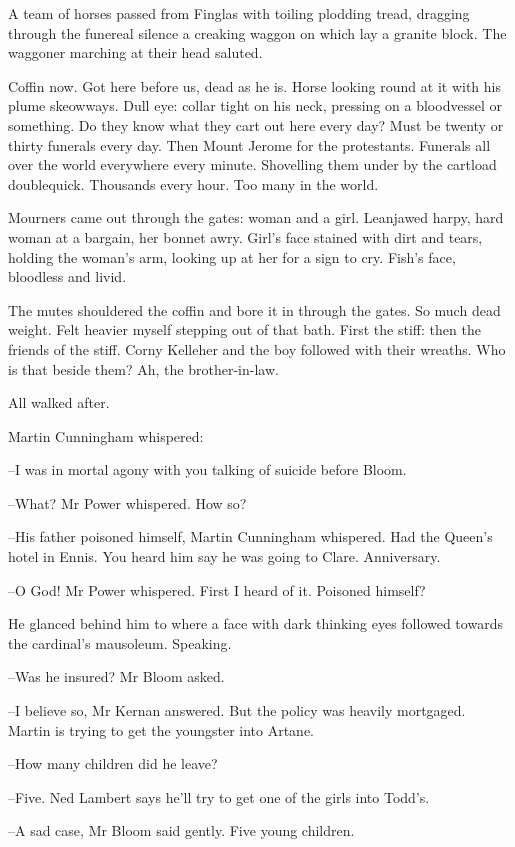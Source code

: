 A team of horses passed from Finglas with toiling plodding tread,
dragging through the funereal silence a creaking waggon
on which lay a granite block.
The waggoner marching at their head saluted.

Coffin now.
Got here before us, dead as he is.
Horse looking round at it with his plume skeowways.
Dull eye:
collar tight on his neck,
pressing on a bloodvessel or something.
Do they know what they cart out here every day?
Must be twenty or thirty funerals every day.
Then Mount Jerome for the protestants.
Funerals all over the world
everywhere every minute.
Shovelling them under by the cartload doublequick.
Thousands every hour.
Too many in the world.

Mourners came out through the gates:
woman and a girl.
Leanjawed harpy, hard woman at a bargain, her bonnet awry.
Girl's face stained with dirt and tears,
holding the woman's arm, looking up at her for a sign to cry.
Fish's face, bloodless and livid.

The mutes shouldered the coffin and bore it in through the gates.
So much dead weight.
Felt heavier myself stepping out of that bath.
First the stiff:
then the friends of the stiff.
Corny Kelleher and the boy followed with their wreaths.
Who is that beside them?
Ah, the brother-in-law.

All walked after.

Martin Cunningham whispered:

--I was in mortal agony with you talking of suicide before Bloom.

--What?
Mr Power whispered.
How so?

--His father poisoned himself,
Martin Cunningham whispered.
Had the Queen's hotel in Ennis.
You heard him say he was going to Clare.
Anniversary.

--O God!
Mr Power whispered.
First I heard of it.
Poisoned himself?

He glanced behind him to where
a face with dark thinking eyes followed towards the cardinal's mausoleum.
Speaking.

--Was he insured?
Mr Bloom asked.

--I believe so,
Mr Kernan answered.
But the policy was heavily mortgaged.
Martin is trying to get the youngster into Artane.

--How many children did he leave?

--Five.
Ned Lambert says he'll try to get one of the girls into Todd's.

--A sad case,
Mr Bloom said gently.
Five young children.

